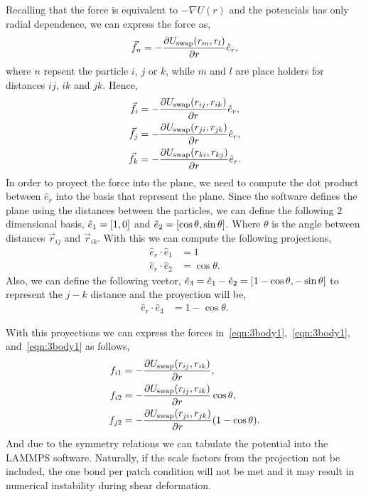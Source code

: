 Recalling that the force is equivalent to $-\nabla U(r)$ and the potencials has only radial dependence, we can express the force as,
\begin{gather}
    \vec{f}_n = -\pdv{U_{\mathrm{swap}}(r_m,r_l)}{r}\hat{e}_r,
\end{gather}
where $n$ repsent the particle $i$, $j$ or $k$, while $m$ and $l$ are place holders for distances $ij$, $ik$ and $jk$.
Hence, 
\begin{align}
    \vec{f_{i}} &= -\pdv{U_{\mathrm{swap}}(r_{ij},r_{ik})}{r}\hat{e}_r\label{eqn:3body1}, \\
    \vec{f_{j}} &= -\pdv{U_{\mathrm{swap}}(r_{ji},r_{jk})}{r}\hat{e}_r\label{eqn:3body2}, \\
    \vec{f_{k}} &= -\pdv{U_{\mathrm{swap}}(r_{ki},r_{kj})}{r}\hat{e}_r\label{eqn:3body3}.
\end{align}
In order to proyect the force into the plane, we need to compute the dot product between $\hat{e}_r$ into the basis that represent the plane. 
Since the software defines the plane using the distances between the particles, we can define the following 2 dimensional basis, $\hat{e}_1=\qty[1,0]$ and $\hat{e}_2=\qty[\cos\theta,\sin\theta]$.
Where $\theta$ is the angle between distances $\vec{r}_{ij}$ and $\vec{r}_{ik}$.
With this we can compute the following projections,
\begin{align}
    \hat{e}_r \cdot \hat{e}_1 &= 1\\
    \hat{e}_r \cdot \hat{e}_2 &= \cos\theta. 
\end{align}
Also, we can define the following vector, $\hat{e}_3 = \hat{e}_1 - \hat{e}_2 = \qty[1-\cos\theta,-\sin\theta]$ to represent the $j-k$ distance and the proyection will be,
\begin{align}
    \hat{e}_r \cdot \hat{e}_3 &= 1-\cos\theta.
\end{align}

With this proyections we can express the forces in~\eqref{eqn:3body1},~\eqref{eqn:3body1}, and~\eqref{eqn:3body1} as follows,
\begin{align}
    f_{i1} &= -\pdv{U_{\mathrm{swap}}(r_{ij},r_{ik})}{r}\label{eqn:3body4a}, \\
    f_{i2} &= -\pdv{U_{\mathrm{swap}}(r_{ij},r_{ik})}{r}\cos\theta\label{eqn:3body4b}, \\
    f_{j2} &= -\pdv{U_{\mathrm{swap}}(r_{ji},r_{jk})}{r}\qty(1-\cos\theta)\label{eqn:3body5}.
\end{align}
And due to the symmetry relations we can tabulate the potential into the LAMMPS software.
Naturally, if the scale factors from the projection not be included, the one bond per patch condition will not be met and it may result in numerical instability during shear deformation.

